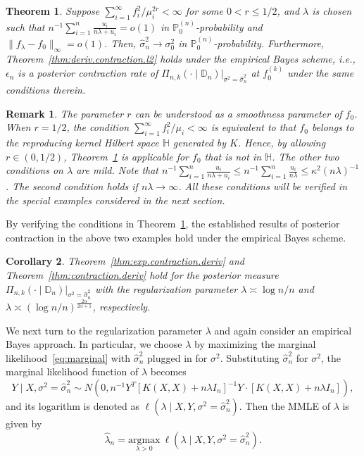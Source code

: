 \documentclass[12pt]{article}
\newcommand\data{\mathbb{D}_n}
\newcommand{\PP}{\mathbb{P}}
\newcommand{\bbH}{\mathbb{H}}
\newcommand{\s}{\sum_{i=1}^{\infty}}
\theoremstyle{plain}
\newtheorem{theorem}{Theorem}
\newtheorem{corollary}[theorem]{Corollary}
\theoremstyle{nonitalicremark}
\newtheorem*{remark}{Remark}
\begin{document}
\begin{theorem}\label{thm:eb.contraction}
Suppose $\s f_i^2/\mu_i^{2r}<\infty$ for some $0<r\leq 1/2$, and $\lambda$ is chosen such that $n^{-1} \sum_{i=1}^{n}\frac{u_i}{n\lambda+u_i} =o(1)$ in $\PP_0^{(n)}$-probability and $\|f_\lambda - f_0\|_\infty = o(1)$. Then, $\hat\sigma_n^2 \rightarrow \sigma_0^2$ in $\PP_0^{(n)}$-probability. Furthermore, Theorem~\ref{thm:deriv.contraction.l2} holds under the empirical Bayes scheme, i.e., $\epsilon_n$ is a posterior contraction rate of $\Pi_{n,k} (\cdot\mid\data)|_{\sigma^2 = \hat \sigma^2_n}$ at $f_0^{(k)}$ under the same conditions therein.
\end{theorem}

\begin{remark}
The parameter $r$ can be understood as a smoothness parameter of $f_0$. When $r=1/2$, the condition $\s f_i^2/\mu_i<\infty$ is equivalent to that $f_0$ belongs to the reproducing kernel Hilbert space $\bbH$ generated by $K$. Hence, by allowing $r \in (0, 1/2)$, Theorem~\ref{thm:eb.contraction} is applicable for $f_0$ that is not in $\bbH$. The other two conditions on $\lambda$ are mild. Note that $n^{-1} \sum_{i=1}^{n}\frac{u_i}{n\lambda+u_i} \leq n^{-1} \sum_{i=1}^{n} \frac{u_i}{n\lambda} \leq \kappa^2 (n\lambda)^{-1}$. The second condition holds if $n\lambda \rightarrow \infty$. All these conditions will be verified in the special examples considered in the next section.
\end{remark}


By verifying the conditions in Theorem~\ref{thm:eb.contraction}, the established results of posterior contraction in the above two examples hold under the empirical Bayes scheme.

\begin{corollary}\label{thm:eb.example}
Theorem~\ref{thm:exp.contraction.deriv} and Theorem~\ref{thm:contraction.deriv} hold for the posterior measure $\Pi_{n,k} (\cdot\mid\data)|_{\sigma^2 = \hat \sigma^2_n}$ with the regularization parameter $\lambda \asymp \log n / n$ and $\lambda\asymp ({\log n}/{n})^{\frac{2\alpha}{2\alpha+1}}$, respectively.
\end{corollary}

We next turn to the regularization parameter $\lambda$ and again consider an empirical Bayes approach. In particular, we choose $\lambda$ by maximizing the marginal likelihood~\eqref{eq:marginal} with $\hat\sigma_n^2$ plugged in for $\sigma^2$. Substituting $\hat\sigma_n^2$ for $\sigma^2$, the marginal likelihood function of $\lambda$ becomes 
\begin{equation}
Y\mid X, \sigma^2 = \hat\sigma_n^2 \sim N(0,n^{-1} Y^T[K(X,X)+n\lambda I_n]^{-1}Y\cdot[K(X,X)+n\lambda I_n]),
\end{equation}
and its logarithm is denoted as $\ell (\lambda \mid X, Y, \sigma^2 = \hat\sigma_n^2)$. Then the MMLE of $\lambda$ is given by
\begin{equation}
\hat \lambda_n = \underset{\lambda > 0}{\text{argmax}} \
 \ell(\lambda \mid X, Y, \sigma^2 = \hat\sigma_n^2).
\end{equation}
\end{document}
